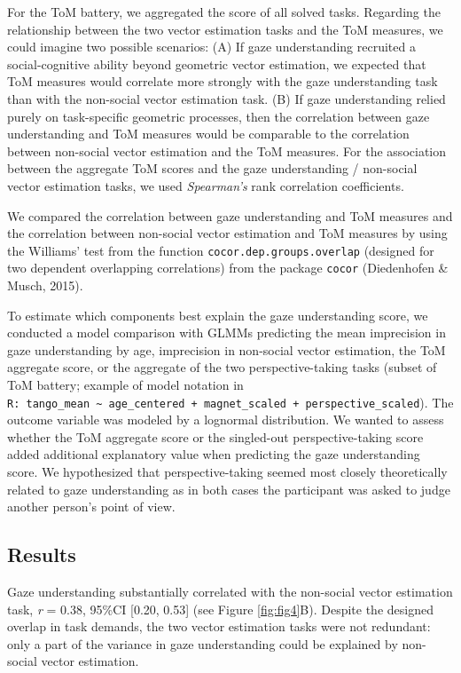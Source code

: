 \documentclass[
  man,mask,floatsintext]{apa7}
\begin{document}
For the ToM battery, we aggregated the score of all solved tasks. Regarding the relationship between the two vector estimation tasks and the ToM measures, we could imagine two possible scenarios: (A) If gaze understanding recruited a social-cognitive ability beyond geometric vector estimation, we expected that ToM measures would correlate more strongly with the gaze understanding task than with the non-social vector estimation task. (B) If gaze understanding relied purely on task-specific geometric processes, then the correlation between gaze understanding and ToM measures would be comparable to the correlation between non-social vector estimation and the ToM measures. For the association between the aggregate ToM scores and the gaze understanding / non-social vector estimation tasks, we used \emph{Spearman's} rank correlation coefficients.

We compared the correlation between gaze understanding and ToM measures and the correlation between non-social vector estimation and ToM measures by using the Williams' test from the function \texttt{cocor.dep.groups.overlap} (designed for two dependent overlapping correlations) from the package \texttt{cocor} (Diedenhofen \& Musch, 2015).

To estimate which components best explain the gaze understanding score, we conducted a model comparison with GLMMs predicting the mean imprecision in gaze understanding by age, imprecision in non-social vector estimation, the ToM aggregate score, or the aggregate of the two perspective-taking tasks (subset of ToM battery; example of model notation in \texttt{R:\ tango\_mean\ \textasciitilde{}\ age\_centered\ +\ magnet\_scaled\ +\ perspective\_scaled}). The outcome variable was modeled by a lognormal distribution. We wanted to assess whether the ToM aggregate score or the singled-out perspective-taking score added additional explanatory value when predicting the gaze understanding score. We hypothesized that perspective-taking seemed most closely theoretically related to gaze understanding as in both cases the participant was asked to judge another person's point of view.

\hypertarget{results-2}{%
\subsection{Results}\label{results-2}}

Gaze understanding substantially correlated with the non-social vector estimation task, \emph{r} = 0.38, 95\%CI {[}0.20, 0.53{]} (see Figure \ref{fig:fig4}B). Despite the designed overlap in task demands, the two vector estimation tasks were not redundant: only a part of the variance in gaze understanding could be explained by non-social vector estimation.
\end{document}
